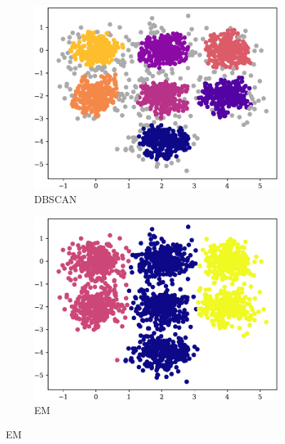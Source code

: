 \begin{figure}[t!]
    \begin{subfigure}[b]{0.45\textwidth}
        \includegraphics[width=\textwidth]{../plots/7-3_pred_dbscan.pdf}
        \caption{DBSCAN}
        \label{subfig:7-3-dbscan}
    \end{subfigure}
    \hspace{0.09\textwidth}
    \begin{subfigure}[b]{0.45\textwidth}
        \includegraphics[width=\textwidth]{../plots/7-3_pred_em.pdf}
        \caption{EM}
        \label{subfig:7-3-em}
    \end{subfigure}
\end{figure}
